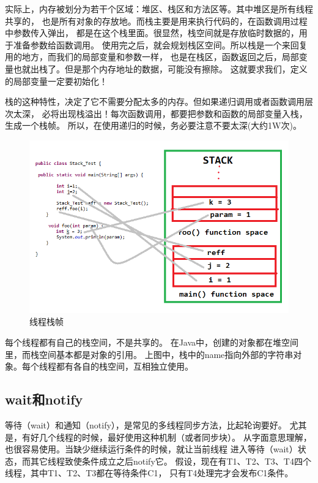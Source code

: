 实际上，内存被划分为若干个区域：堆区、栈区和方法区等。其中堆区是所有线程共享的，
也是所有对象的存放地。而栈主要是用来执行代码的，在函数调用过程中参数传入弹出，
都是在这个栈里面。很显然，栈空间就是存放临时数据的，用于准备参数给函数调用。
使用完之后，就会规划栈区空间。所以栈是一个来回复用的地方，而我们的局部变量和参数一样，
也是在栈区，函数返回之后，局部变量也就出栈了。但是那个内存地址的数据，可能没有擦除。
这就要求我们，定义的局部变量一定要初始化！

栈的这种特性，决定了它不需要分配太多的内存。但如果递归调用或者函数调用层次太深，
必将出现栈溢出！每次函数调用，都要把参数和函数的局部变量入栈，生成一个栈帧。
所以，在使用递归的时候，务必要注意不要太深(大约1W次)。

\begin{figure}[!htb]
\centerline{\includegraphics[width=.4\figwidth]{images/stack_memory_space.png}}
\label{fig:part1_thread_stack}
\caption{线程栈帧}
\end{figure}

每个线程都有自己的栈空间，不是共享的。
在Java中，创建的对象都在堆空间里，而栈空间基本都是对象的引用。
上图中，栈中的name指向外部的字符串对象。每个线程都有各自的栈空间，互相独立使用。

\subsection{wait和notify}
等待（wait）和通知（notify），是常见的多线程同步方法，比起轮询要好。
尤其是，有好几个线程的时候，最好使用这种机制（或者同步块）。
从字面意思理解，也很容易使用。当缺少继续运行条件的时候，就让当前线程
进入等待（wait）状态，而其它线程致使条件成立之后notify它。
假设，现在有T1、T2、T3、T4四个线程，其中T1、T2、T3都在等待条件C1，
只有T4处理完才会发布C1条件。
\vspace{0.2cm}

